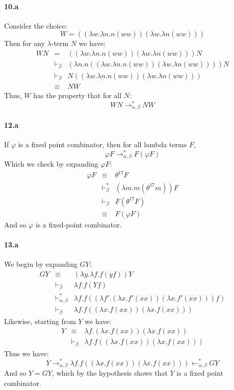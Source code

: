 \documentclass{article}
\begin{document}
\paragraph{10.a}
Consider the choice:
\[ W = ((\lambda w. \lambda n. n (w w) ) ( \lambda w. \lambda n (w w) )) \]
Then for any $\lambda$-term $N$ we have:
\begin{eqnarray*}
W N & = & ((\lambda w. \lambda n. n (w w) ) ( \lambda w. \lambda n (w w) )) N \\
& \vdash_\beta & (\lambda n . n ((\lambda w. \lambda n. n (w w) ) ( \lambda w. \lambda n (w w) ))) N \\
& \vdash_\beta & N ((\lambda w. \lambda n. n (w w) ) ( \lambda w. \lambda n (w w) )) \\
& \equiv & N W
\end{eqnarray*}
Thus, $W$ has the property that for all $N$:
\[ W N \to^*_{\alpha,\beta} N W \]

\paragraph{12.a}
If $\varphi$ is a fixed point combinator, then for all lambda terms $F$,
\[ \varphi F \to^*_{\alpha, \beta} F (\varphi F) \]
Which we check by expanding $\varphi F$:
\begin{eqnarray*}
\varphi F & \equiv & \theta^{17} F \\
& \vdash_\beta^* & (\lambda m . m ( \theta^{17} m)) F \\
& \vdash_\beta & F ( \theta^{17} F) \\
& \equiv & F ( \varphi F)
\end{eqnarray*}
And so $\varphi$ is a fixed-point combinator.

\paragraph{13.a}
We begin by expanding $G Y$:
\begin{eqnarray*}
G Y & \equiv & ( \lambda y . \lambda f . f ( y f ) ) Y \\
& \vdash_\beta & \lambda f . f ( Y f ) \\
& \vdash_{\alpha, \beta}^* & \lambda f . f ( (\lambda f'. ( \lambda x. f'(xx)) ( \lambda x. f'(xx))) f )  \\
& \vdash_\beta & \lambda f . f ( (\lambda x . f(xx)) ( \lambda x. f(xx)) )
\end{eqnarray*}
Likewise, starting from $Y$ we have:
\begin{eqnarray*}
Y & \equiv & \lambda f. (\lambda x. f(xx)) (\lambda x. f(xx)) \\
& \vdash_\beta & \lambda f . f ( (\lambda x. f(xx)) (\lambda x. f(xx)) )
\end{eqnarray*}
Thus we have:
\[ Y \rightarrow^*_{\alpha,\beta} \lambda f . f ( (\lambda x. f(xx)) (\lambda x. f(xx)) ) \leftarrow^*_{\alpha,\beta} G Y \]
And so $Y = GY$, which by the hypothesis shows that $Y$ is a fixed point combinator.
\end{document}
